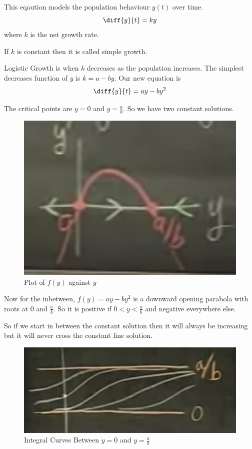 This eqaution models the population behaviour $y(t)$ over time.
$$ \diff{y}{t} = ky $$
where $k$ is the net growth rate.

If $k$ is constant then it is called simple growth.

Logistic Growth is when $k$ decreases as the population increases.
The simplest decreases function of $y$ is $k = a - by$.
Our new equation is 
$$ \diff{y}{t} = ay - by^2 $$

The critical points are $y = 0$ and $y = \frac{a}{b}$.
So we have two constant solutions.

\begin{figure}[ht!]
    \centering
    \includegraphics[scale=0.6]{./images/lecture_5_figure_2.png}
    \caption{Plot of $f(y)$ against $y$}
\end{figure}

Now for the inbetween, $f(y) = ay - by^2$ is a downward opening parabola with roots at $0$ and $\frac{a}{b}$.
So it is positive if $0 < y < \frac{a}{b}$ and negative everywhere else.

So if we start in between the constant solution then it will always be increasing but it will never cross the constant line solution.

\begin{figure}[ht!]
    \centering
    \includegraphics[scale=0.5]{./images/lecture_5_figure_3.png}
    \caption{Integral Curves Between $y = 0$ and $y = \frac{a}{b}$}
\end{figure}

